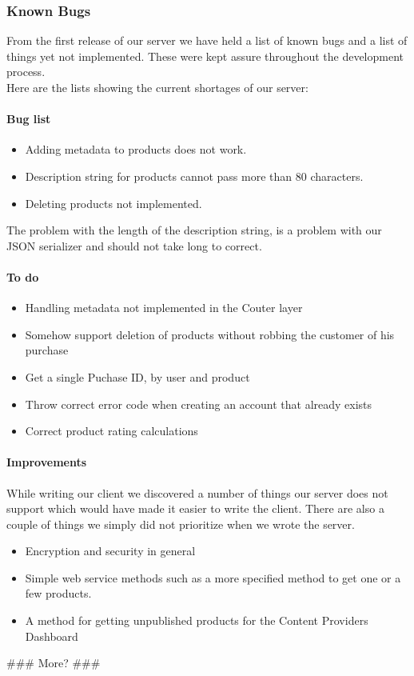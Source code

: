 \subsubsection{Known Bugs}
From the first release of our server we have held a list of known bugs and a list of things yet not implemented. These were kept assure throughout the development process.
\\Here are the lists showing the current shortages of our server:
\paragraph{Bug list}
\begin{itemize}
\item Adding metadata to products does not work.
\item Description string for products cannot pass more than 80 characters.
\item Deleting products not implemented.
\end{itemize}
The problem with the length of the description string, is a problem with our JSON serializer and should not take long to correct.
\paragraph{To do}
\begin{itemize}
\item Handling metadata not implemented in the C\Sh outer layer
\item Somehow support deletion of products without robbing the customer of his purchase
\item Get a single Puchase ID, by user and product
\item Throw correct error code when creating an account that already exists
\item Correct product rating calculations
\end{itemize}
\paragraph{Improvements}
While writing our client we discovered a number of things our server does not support which would have made it easier to write the client. There are also a couple of things we simply did not prioritize when we wrote the server.
\begin{itemize}
\item Encryption and security in general
\item Simple web service methods such as a more specified method to get one or a few products.
\item A method for getting unpublished products for the Content Providers Dashboard
\end{itemize}
\#\#\# More? \#\#\#